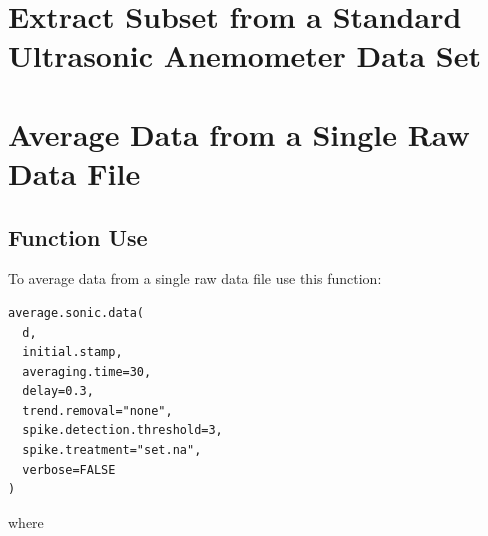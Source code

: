 \documentclass[a4paper,10pt]{book}
\begin{document}
\section{Extract Subset from a Standard Ultrasonic Anemometer Data Set}
\label{sec:Extract Subset from Raw Data Set}


\section{Average Data from a Single Raw Data File}
\label{sec:Average Single Raw Data File}

\subsection{Function Use}

To average data from a single raw data file use this function:

\begin{verbatim}
average.sonic.data(
  d, 
  initial.stamp,
  averaging.time=30,
  delay=0.3,
  trend.removal="none",
  spike.detection.threshold=3,
  spike.treatment="set.na",
  verbose=FALSE
)
\end{verbatim} 

\noindent where
\end{document}

